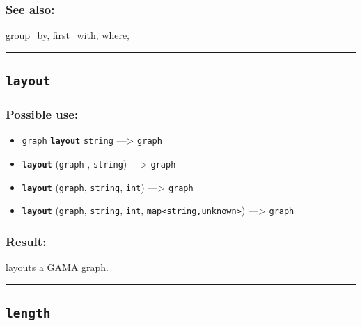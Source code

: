 \documentclass[]{book}
\providecommand{\tightlist}{%
  \setlength{\itemsep}{0pt}\setlength{\parskip}{0pt}}
\theoremstyle{definition}
\theoremstyle{definition}
\theoremstyle{definition}
\theoremstyle{remark}
\begin{document}
\subsubsection{See also:}\label{see-also-124}

\href{OperatorsDH\#group_by}{group\_by},
\href{OperatorsDH\#first_with}{first\_with},
\href{OperatorsSZ\#where}{where},

\begin{center}\rule{0.5\linewidth}{\linethickness}\end{center}

\subsection{\texorpdfstring{\texttt{layout}}{layout}}\label{layout}

\subsubsection{Possible use:}\label{possible-use-319}

\begin{itemize}
\tightlist
\item
  \texttt{graph} \textbf{\texttt{layout}} \texttt{string}
  ---\textgreater{} \texttt{graph}
\item
  \textbf{\texttt{layout}} (\texttt{graph} , \texttt{string})
  ---\textgreater{} \texttt{graph}
\item
  \textbf{\texttt{layout}} (\texttt{graph}, \texttt{string},
  \texttt{int}) ---\textgreater{} \texttt{graph}
\item
  \textbf{\texttt{layout}} (\texttt{graph}, \texttt{string},
  \texttt{int}, \texttt{map\textless{}string,unknown\textgreater{}})
  ---\textgreater{} \texttt{graph}
\end{itemize}

\subsubsection{Result:}\label{result-309}

layouts a GAMA graph.

\begin{center}\rule{0.5\linewidth}{\linethickness}\end{center}

\subsection{\texorpdfstring{\texttt{length}}{length}}\label{length}
\end{document}
